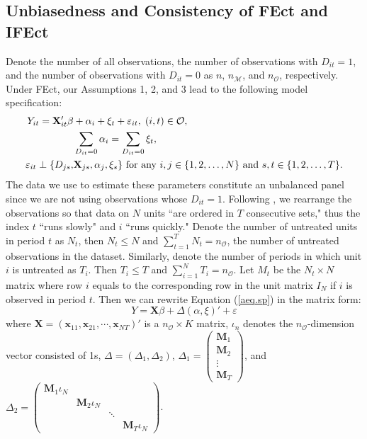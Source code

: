 \documentclass[12pt]{article}
\begin{document}
\subsection{Unbiasedness and Consistency of FEct and IFEct}

Denote the number of all observations, the number of observations with $D_{it} = 1$, and the number of observations with $D_{it} = 0$ as $n$, $n_{\mathcal{M}}$, and $n_{\mathcal{O}}$, respectively. Under FEct, our Assumptions 1, 2, and 3 lead to the following model specification:
  \begin{align}
   Y_{it} = \mathbf{X}_{it}'\beta & + \alpha_{i} + \xi_{t} +
  \varepsilon_{it},  \hspace{1mm} (i, t) \in \mathcal{O},   \label{aeq.sp}\\
  & \sum_{D_{it} = 0}\alpha_{i} =  \sum_{D_{it} = 0} \xi_t, \notag \\
 \varepsilon_{it} \perp \{D_{js}, & \mathbf{X}_{js} , \alpha_{j}, \xi_{s}\} \text{ for any } i,j \in \{1,2,\dots,N\} \text{ and } s,t \in \{1,2,\dots,T\}. \notag
   \end{align}   
The data we use to estimate these parameters constitute an unbalanced panel since we are not using observations whose $D_{it}=1$. Following \citet{wansbeek1989estimation}, we rearrange the observations so that data on $N$ units ``are ordered in $T$ consecutive sets," thus the index $t$ ``runs slowly" and $i$ ``runs quickly." Denote the number of untreated units in period $t$ as $N_t$, then $N_t \leq N$ and $\sum_{t=1}^{T} N_t = n_{\mathcal{O}}$, the number of untreated observations in the dataset. Similarly, denote the number of periods in which unit $i$ is untreated as $T_i$. Then $T_i \leq T$ and $\sum_{i=1}^{N} T_i = n_{\mathcal{O}}$.  Let $M_t$ be the $N_t \times N$ matrix where row $i$ equals to the corresponding row in the unit matrix $I_{N}$ if $i$ is observed in period $t$. Then we can rewrite Equation (\ref{aeq.sp}) in the matrix form:
\begin{equation*}
Y = \mathbf{X} \beta + \Delta (\alpha, \xi)' + \varepsilon
\end{equation*}
  where $\mathbf{X} = (\mathbf{x}_{11}, \mathbf{x}_{21}, \cdots, \mathbf{x}_{NT})'$ is a $n_{\mathcal{O}} \times K$ matrix, $\iota_n$ denotes the $n_{\mathcal{O}}$-dimension vector consisted of 1s, $\Delta = (\Delta_{1}, \Delta_{2})$,  $\Delta_{1} = \begin{pmatrix}
  \mathbf{M}_1 \\
  \mathbf{M}_2 \\
  \vdots \\
  \mathbf{M}_T
  \end{pmatrix}$, and $\Delta_{2} = \begin{pmatrix}
  \mathbf{M}_1 \iota_{N} & & &    \\
  & \mathbf{M}_2 \iota_{N} \\
  & & \ddots \\
  & & & \mathbf{M}_T \iota_{N}
  \end{pmatrix}$. \\
\end{document}
